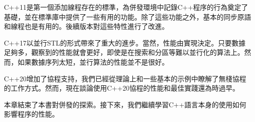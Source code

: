 C++11是第一個添加線程存在的標準，為併發環境中記錄C++程序的行為奠定了基礎，並在標準庫中提供了一些有用的功能。除了這些功能之外，基本的同步原語和線程也是有用的。後續版本對這些特性進行了改進。

C++17以並行STL的形式帶來了重大的進步。當然，性能由實現決定。只要數據足夠多，觀察到的性能就會更好，即使是在搜索和分區等難以並行化的算法上。然而，如果數據序列太短，並行算法的性能並不是很好。

C++20增加了協程支持，我們已經從理論上和一些基本的示例中瞭解了無棧協程的工作方式。然而，現在談論使用C++20協程的性能和最佳實踐還為時過早。

本章結束了本書對併發的探索。接下來，我們繼續學習C++語言本身的使用如何影響程序的性能。